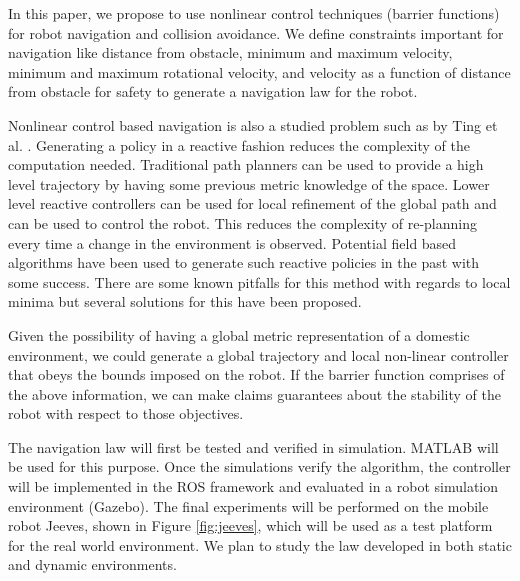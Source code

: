 \documentclass[journal]{IEEEtran}
\begin{document}
In this paper, we propose to use nonlinear control techniques (barrier functions) for robot navigation and collision avoidance. We define constraints important for navigation like distance from obstacle, minimum and maximum velocity, minimum and maximum rotational velocity, and velocity as a function of distance from obstacle for safety to generate a navigation law for the robot.

Nonlinear control based navigation is also a studied problem such as by Ting et al. \cite{ting2014reactive}. Generating a policy in a reactive fashion reduces the complexity of the computation needed. Traditional path planners can be used to provide a high level trajectory by having some previous metric knowledge of the space. Lower level reactive controllers can be used for local refinement of the global path and can be used to control the robot. This reduces the complexity of re-planning every time a change in the environment is observed. Potential field based algorithms have been used to generate such reactive policies in the past with some success. There are some known pitfalls for this method with regards to local minima but several solutions for this have been proposed.

Given the possibility of having a global metric representation of a domestic environment, we could generate a global trajectory and local non-linear controller that obeys the bounds imposed on the robot.  If the barrier function comprises of the above information, we can make claims guarantees about the stability of the robot with respect to those objectives.

The navigation law will first be tested and verified in simulation. MATLAB will be used for this purpose. Once the simulations verify the algorithm, the controller will be implemented in the ROS framework and evaluated in a robot simulation environment (Gazebo). The final experiments will be performed on the mobile robot Jeeves, shown in Figure \ref{fig:jeeves}, which will be used as a test platform for the real world environment. We plan to study the law developed in both static and dynamic environments. 
\end{document}
